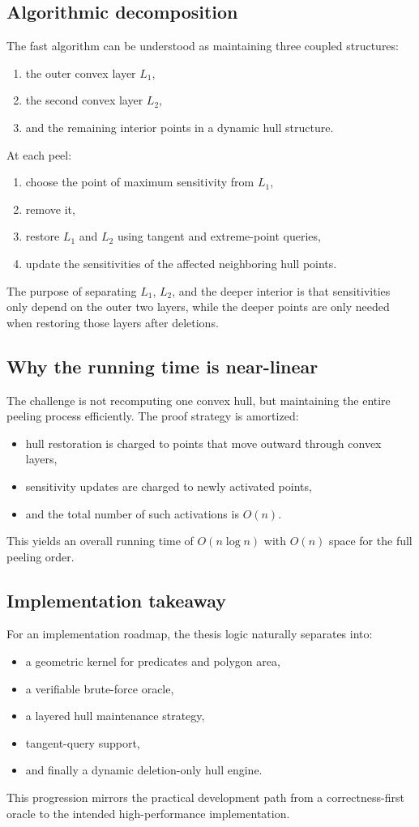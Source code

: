 \subsection*{Algorithmic decomposition}
The fast algorithm can be understood as maintaining three coupled structures:
\begin{enumerate}
    \item the outer convex layer $L_1$,
    \item the second convex layer $L_2$,
    \item and the remaining interior points in a dynamic hull structure.
\end{enumerate}
At each peel:
\begin{enumerate}
    \item choose the point of maximum sensitivity from $L_1$,
    \item remove it,
    \item restore $L_1$ and $L_2$ using tangent and extreme-point queries,
    \item update the sensitivities of the affected neighboring hull points.
\end{enumerate}
The purpose of separating $L_1$, $L_2$, and the deeper interior is that sensitivities only depend on the outer two layers, while the deeper points are only needed when restoring those layers after deletions.

\subsection*{Why the running time is near-linear}
The challenge is not recomputing one convex hull, but maintaining the entire peeling process efficiently. The proof strategy is amortized:
\begin{itemize}
    \item hull restoration is charged to points that move outward through convex layers,
    \item sensitivity updates are charged to newly activated points,
    \item and the total number of such activations is $O(n)$.
\end{itemize}
This yields an overall running time of $O(n \log n)$ with $O(n)$ space for the full peeling order.

\subsection*{Implementation takeaway}
For an implementation roadmap, the thesis logic naturally separates into:
\begin{itemize}
    \item a geometric kernel for predicates and polygon area,
    \item a verifiable brute-force oracle,
    \item a layered hull maintenance strategy,
    \item tangent-query support,
    \item and finally a dynamic deletion-only hull engine.
\end{itemize}
This progression mirrors the practical development path from a correctness-first oracle to the intended high-performance implementation.

